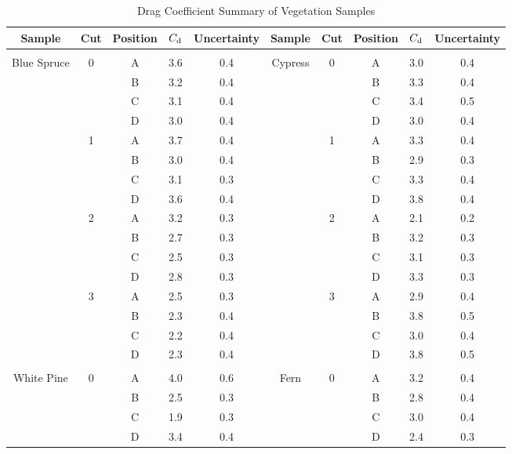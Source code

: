 \documentclass[12pt]{article}
\begin{document}
\begin{table}
\caption{Drag Coefficient Summary of Vegetation Samples}
\label{tab:SumTable}
\centering

	\footnotesize
	\begin{tabular}{cccccccccc}	
			\hline
\textbf{Sample}		&	\textbf{Cut}	&\textbf{Position}& $C_{\rm d}$ 	&\textbf{Uncertainty}	&\textbf{Sample}	&	\textbf{Cut}	&\textbf{Position}& 	\textbf{$C_{\rm d}$ }&\textbf{Uncertainty}\\
\hline
\\[0.05cm]
Blue Spruce			&	0	&	A	& 	3.6	&	0.4				& Cypress       &	0	&	A	& 	3.0	&	0.4	\\
					&		&	B	& 	3.2	&	0.4				&				&		&	B	& 	3.3	&	0.4	\\
					&		&	C	& 	3.1	&	0.4				&				&		&	C	& 	3.4	&	0.5	\\
					&		&	D	& 	3.0	&	0.4				&				&		&	D	& 	3.0	&	0.4	\\
					&	1	&	A	& 	3.7	&	0.4				&				&	1	&	A	& 	3.3	&	0.4	\\
					&		&	B	& 	3.0	&	0.4				&				&		&	B	& 	2.9	&	0.3	\\
					&		&	C	& 	3.1	&	0.3				&				&		&	C	& 	3.3	&	0.4	\\
					&		&	D	& 	3.6	&	0.4				&				&		&	D	& 	3.8	&	0.4	\\
					&	2	&	A	& 	3.2	&	0.3				&				&	2	&	A	& 	2.1	&	0.2	\\
					&		&	B	& 	2.7	&	0.3				&				&		&	B	& 	3.2	&	0.3	\\
					&		&	C	& 	2.5	&	0.3				&				&		&	C	& 	3.1	&	0.3	\\
					&		&	D	& 	2.8	&	0.3				&				&		&	D	& 	3.3	&	0.3	\\
					&	3	&	A	& 	2.5	&	0.3				&				&	3	&	A	& 	2.9	&	0.4	\\
					&		&	B	& 	2.3	&	0.4				&				&		&	B	& 	3.8	&	0.5	\\
					&		&	C	& 	2.2	&	0.4				&				&		&	C	& 	3.0	&	0.4	\\
					&		&	D	& 	2.3	&	0.4				&				&		&	D	& 	3.8	&	0.5	\\
					&		&		& 		&					&				&		&		& 		&		\\
White Pine	        &	0	&	A	& 	4.0	&	0.6				& Fern	        &	0	&	A	& 	3.2	&	0.4	\\
					&		&	B	& 	2.5	&	0.3				&				&		&	B	& 	2.8	&	0.4	\\	
					&		&	C	& 	1.9	&	0.3				&				&		&	C	& 	3.0	&	0.4	\\
					&		&	D	& 	3.4	&	0.4				&				&		&	D	& 	2.4	&	0.3	\\

\end{tabular}
\end{table}
\end{document}
